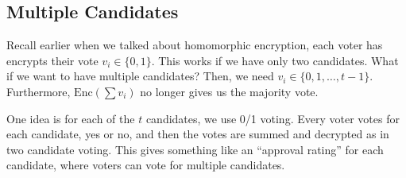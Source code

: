 

\subsection{Multiple Candidates}

Recall earlier when we talked about homomorphic encryption, each voter has encrypts their vote $v_i \in \{0, 1\}$. This works if we have only two candidates. What if we want to have multiple candidates? Then, we need $v_i \in \{0, 1, \dots, t-1\}$. Furthermore, $\text{Enc}(\sum v_i)$ no longer gives us the majority vote.

One idea is for each of the $t$ candidates, we use 0/1 voting. Every voter votes for each candidate, yes or no, and then the votes are summed and decrypted as in two candidate voting. This gives something like an ``approval rating'' for each candidate, where voters can vote for multiple candidates.




